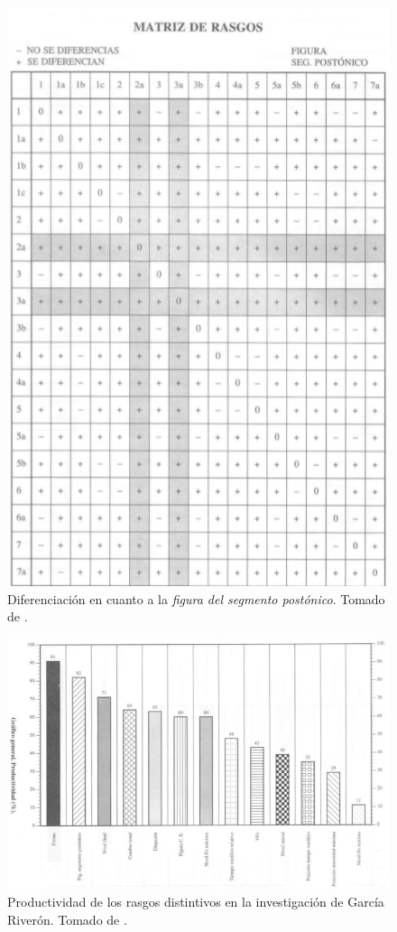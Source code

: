 \begin{figure}
\begin{center}
\includegraphics[width= 0.7\columnwidth]{Graphics/rasgos_figura}
\caption{Diferenciaci\'on en cuanto a la \emph{figura del segmento post\'onico}. Tomado de \cite[p.221]{garcia1996aspectos2}.}
\label{rasgos_figura}
\end{center}
\end{figure}


\begin{figure}
\begin{center}
\includegraphics[width= 0.7\columnwidth]{Graphics/productividad}
\caption{Productividad de los rasgos distintivos en la investigaci\'on de Garc\'ia River\'on. Tomado de \cite[p.233]{garcia1996aspectos2}.}
\label{productividad}
\end{center}
\end{figure}


